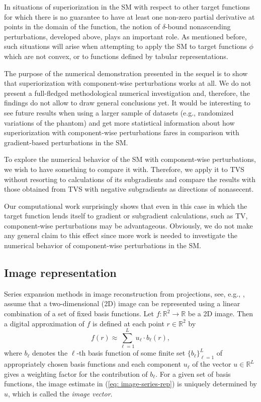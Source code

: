 \documentclass[smallextended]{svjour3}      %
\begin{document}
In situations of superiorization in the SM with respect to other target functions for which there is no guarantee to have at least one non-zero partial derivative at points in the domain of the function, the notion of $\delta$-bound nonascending perturbations, developed above, plays an important role. As mentioned before, such situations will arise when attempting to apply the SM to target functions $\phi$ which are not convex, or to functions defined by tabular representations.

The purpose of the numerical demonstration presented in the sequel is to show that superiorization with component-wise perturbations works at all. We do not present a full-fledged methodological numerical investigation and, therefore, the findings do not allow to draw general conclusions yet. It would be interesting to see future results when using a larger sample of datasets (e.g., randomized variations of the phantom) and get more statistical information about how superiorization with component-wise perturbations fares in comparison with gradient-based perturbations in the SM.

To explore the numerical behavior of the SM with component-wise perturbations, we wish to have something to compare it with. Therefore, we apply it to TVS without resorting to calculations of its subgradients and compare the results with those obtained from TVS with negative subgradients as directions of nonasecent.

Our computational work surprisingly shows that even in this case in which the target function lends itself to gradient or subgradient calculations, such as TV, component-wise perturbations may be advantageous. Obviously, we do not make any general claim to this effect since more work is needed to investigate the numerical behavior of component-wise perturbations in the SM.

\subsection{Image representation}

Series expansion methods in image reconstruction from projections, see, e.g., \cite{herman2009book}, assume that a two-dimensional (2D) image can be represented using a linear combination of a set of fixed basis functions. Let $f:\mathbb{R}^{2}\rightarrow\mathbb{R}$ be a 2D image. Then a digital approximation of $f$ is defined at each point $r\in\mathbb{R}^{2}$ by
\begin{equation}
f(r)\approx\sum_{\ell=1}^{L}u_{\ell}\cdot b_{\ell}(r),\label{eq: image-series-rep}
\end{equation}
where $b_{\ell}$ denotes the $\ell$-th basis function of some finite set $\lbrace b_{\ell}\rbrace_{\ell=1}^{L}$ of appropriately chosen basis functions and each component $u_{\ell}$ of the vector $u\in\mathbb{R}^{L}$ gives a weighting factor for the contribution of $b_{\ell}$. For a given set of basis functions, the image estimate in (\ref{eq: image-series-rep}) is uniquely determined by $u$, which is called the \textit{image vector}.
\end{document}

